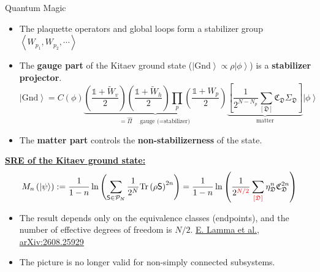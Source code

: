 \documentclass[professionalfont,
                xcolor=dvipsnames]{beamer}
\newcommand{\anglelr}[1]{\left\langle #1 \right\rangle}
\newcommand{\lr}[1]{\left(#1\right)}
\newcommand{\lrm}[1]{\left[#1\right]}
\newcommand{\ket}[1]{\left| #1 \right\rangle}
\newcommand{\mrm}[1]{\mathrm{#1}}
\newcommand{\scite}[2]{\href{ #1 }{{\tiny #2}}} %
\begin{document}
\begin{frame}{Quantum Magic}

\begin{itemize}
    \item The plaquette operators and global loops form a stabilizer group
    $
    \anglelr{
    W_{p_1}, W_{p_2},\cdots
    }
    $
    \item The \textbf{gauge part} of the Kitaev ground state ($\ket{\mrm{Gnd}} \propto \rho \ket{\phi}$) is a \textbf{stabilizer projector}.
    \[
        \ket{\mrm{Gnd}}
        =
        C(\phi)
        \underbrace{
        \lr{\frac{\mathds{1} + \tilde{W}_v}{2}} 
        \lr{\frac{\mathds{1} + \tilde{W}_h}{2}}
        \prod_{p} \lr{\frac{\mathds{1} + W_p}{2}}
        }_{=\hat{\Pi} \quad \text{gauge ($=$stabilizer)}}
        \underbrace{
        \lrm{
            \frac{1}{2^{N - N_p}}
            \sum_{[\mathfrak{D}]} \mathfrak{C}_{\mathfrak{D}}
            \Sigma_\mathfrak{D}
        }
        }_{\text{matter}}
        \ket{\phi}
    \]
    \item The \textbf{matter part} controls the \textbf{non-stabilizerness} of the state.
\end{itemize}

\pause

\textbf{\underline{SRE of the Kitaev ground state:}}
\[
M_{n}\lr{\ket{\psi}} := 
\frac{1}{1 - n} 
\ln\lr{
    \sum_{\mathsf{S}\in\mathcal{P}_N}
    \frac{1}{2^N}
    \mrm{Tr}\lr{\rho\mathsf{S}}^{2n}
}
=
\frac{1}{1 - n}
\ln\lr{
    \frac{1}{2^{\color{red} N/2}}
    \sum_{\color{red}[\mathfrak{D}]} \eta_\mathfrak{D}^n \mathfrak{C}_\mathfrak{D}^{2n}
}
\]
\begin{itemize}
    \item The result depends only on the equivalence classes (endpoints), and the number of effective degrees of freedom is \alert{$N/2$}. \scite{https://arxiv.org/abs/2608.25929}{E. Lamma et al., arXiv:2608.25929}
    \item The picture is no longer valid for non-simply connected subsystems.
\end{itemize}
\end{frame}
\end{document}
